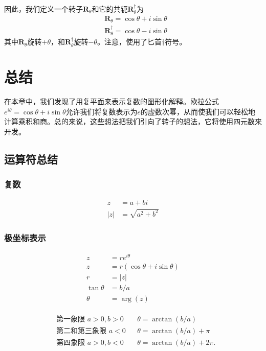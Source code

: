 因此，我们定义一个转子$\mathbf{R}_{\theta}$和它的共轭$\mathbf{R}_{\theta}^{\dagger}$为
$$
\begin{aligned}
& \mathbf{R}_{\theta}=\cos \theta+i \sin \theta \\
& \mathbf{R}_{\theta}^{\dagger}=\cos \theta-i \sin \theta
\end{aligned}
$$
其中$\mathbf {R} _{\theta}$旋转$+ \theta$，和$\mathbf{R}_{\theta}^{\dagger}$旋转$- \theta$。注意，使用了匕首$\dagger$符号。

\section{总结}
在本章中，我们发现了用复平面来表示复数的图形化解释。欧拉公式$e^{i \theta}=\cos \theta+i \sin \theta$允许我们将复数表示为$e$的虚数次幂，从而使我们可以轻松地计算乘积和商。总的来说，这些想法把我们引向了转子的想法，它将使用四元数来开发。

\subsection{运算符总结}
\subsubsection*{复数}
$$
\begin{aligned}
z & =a+b i \\
|z| & =\sqrt{a^{2}+b^{2}}
\end{aligned}
$$

\subsubsection*{极坐标表示}

$$
\begin{aligned}
z & =r e^{i \theta} \\
z & =r(\cos \theta+i \sin \theta) \\
r & =|z| \\
\tan \theta & =b / a \\
\theta & =\arg (z)
\end{aligned}
$$

\begin{align*}
    \begin{aligned}
        &\text{第一象限  } a>0, b>0 && \theta=\arctan (b / a)\\
        &\text{第二和第三象限  } a<0 && \theta=\arctan (b / a)+\pi\\
        &\text{第四象限  } a>0, b<0 && \theta=\arctan (b / a)+2 \pi.
    \end{aligned}
\end{align*}


